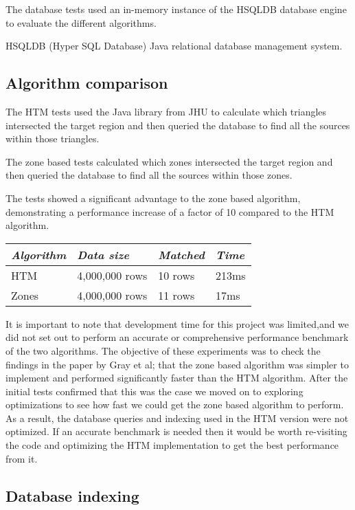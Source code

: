 \documentclass{article}
\newcommand{\hsqldb} {HSQLDB\xspace}
\begin{document}
The database tests used an in-memory instance of the \hsqldb database engine to evaluate the different algorithms.

HSQLDB (Hyper SQL Database) Java relational database management system.

\subsection{Algorithm comparison}
\label{database-algorithms}

The HTM tests used the Java library from JHU to calculate which triangles intersected the target region and then queried the database to find all the sources within those triangles.

The zone based tests calculated which zones intersected the target region and then queried the database to find all the sources within those zones.

The tests showed a significant advantage to the zone based algorithm, demonstrating a performance increase of a factor of 10 compared to the HTM algorithm.

\begin{table}[h]
\centering
\begin{tabular}{|l|l|l|l|}
\hline
\textit{Algorithm} & \textit{Data size} & \textit{Matched} & \textit{Time}  \\ \hline
HTM   & 4,000,000 rows & 10 rows & 213ms \\ \hline
Zones & 4,000,000 rows & 11 rows & 17ms  \\ \hline
\end{tabular}
\end{table}

It is important to note that development time for this project was limited,and we did not set out to perform an accurate or comprehensive performance benchmark of the two algorithms.
The objective of these experiments was to check the findings in the paper by Gray et al; that the zone based algorithm was simpler to implement and performed significantly faster than the HTM algorithm.
After the initial tests confirmed that this was the case we moved on to exploring optimizations to see how fast we could get the zone based algorithm to perform.
As a result, the database queries and indexing used in the HTM version were not optimized.
If an accurate benchmark is needed then it would be worth re-visiting the code and optimizing the HTM implementation to get the best performance from it.

\subsection{Database indexing}
\label{database-indexing}
\end{document}
